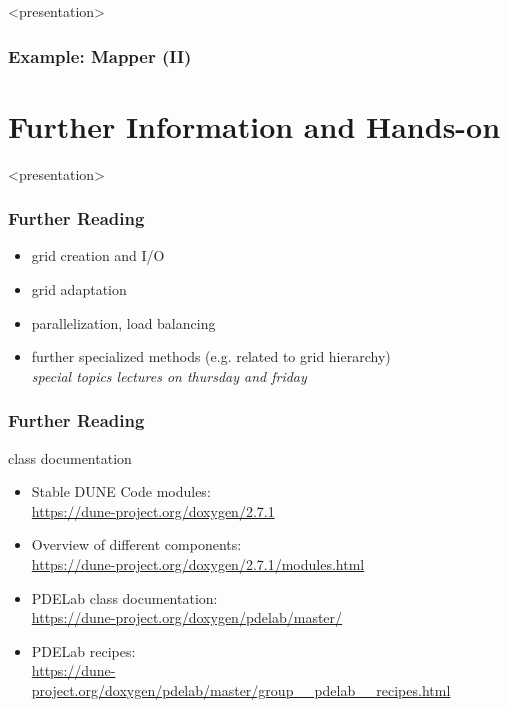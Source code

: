 \documentclass[aspectratio=169,11pt]{beamer}
\theoremstyle{definition}
\begin{document}
\begin{onlyenv}<presentation>
\begin{frame} \frametitle{Example: Mapper (II)}
\scriptsize
\begin{codeblock}
  
\end{codeblock}
\end{frame}
\end{onlyenv}

\section{Further Information and Hands-on}

\begin{onlyenv}<presentation>
  \begin{frame}
    \frametitle{Further Reading}
    \begin{itemize}
    \item grid creation and I/O\\
      \medskip
      \pause\pause
      \bigskip
    \item grid adaptation
      \medskip
    \item parallelization, load balancing
      \medskip
    \item further specialized methods (e.g. related to grid hierarchy)\\
      \pause
      \medskip
      \rightarrownice \emph{special topics lectures on thursday and friday}
    \end{itemize}
  \end{frame}
\end{onlyenv}

\begin{frame}
  \frametitle{Further Reading}

   class documentation

  \begin{itemize}
  \item Stable DUNE Code modules:\\ \url{https://dune-project.org/doxygen/2.7.1}
    \bigskip
  \item Overview of different components:\\
    \url{https://dune-project.org/doxygen/2.7.1/modules.html}
    \bigskip
  \item PDELab class documentation:\\
    \url{https://dune-project.org/doxygen/pdelab/master/}
    \bigskip
  \item PDELab recipes:\\
    \url{https://dune-project.org/doxygen/pdelab/master/group__pdelab__recipes.html}
  \end{itemize}
  
\end{frame}
\end{document}
